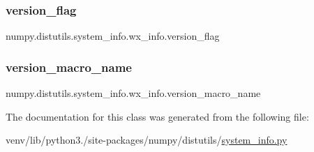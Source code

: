 \subsubsection{\texorpdfstring{version\+\_\+flag}{version\_flag}}
{\footnotesize\ttfamily numpy.\+distutils.\+system\+\_\+info.\+wx\+\_\+info.\+version\+\_\+flag\hspace{0.3cm}{\ttfamily [static]}}

\mbox{\label{classnumpy_1_1distutils_1_1system__info_1_1wx__info_a0b28360ea7be273d2d065a7b3d1b2c16}} 
\subsubsection{\texorpdfstring{version\+\_\+macro\+\_\+name}{version\_macro\_name}}
{\footnotesize\ttfamily numpy.\+distutils.\+system\+\_\+info.\+wx\+\_\+info.\+version\+\_\+macro\+\_\+name\hspace{0.3cm}{\ttfamily [static]}}



The documentation for this class was generated from the following file\+:\begin{DoxyCompactItemize}
\item 
venv/lib/python3./site-\/packages/numpy/distutils/\hyperlink{system__info_8py}{system\+\_\+info.\+py}\end{DoxyCompactItemize}
